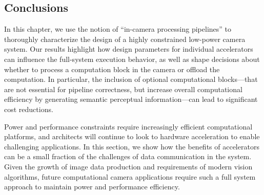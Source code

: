 


\subsection{Conclusions}
 \label{sec:nsp-conclusion}

In this chapter, we use the notion of ``in-camera processing pipelines'' to thoroughly characterize the design of a highly constrained low-power camera system.
Our results highlight how design parameters for individual accelerators can influence the full-system execution behavior, as well as shape decisions about whether to process a computation block in the camera or offload the computation.
In particular, the inclusion of optional computational blocks---that are not essential for pipeline correctness, but increase overall computational efficiency by generating semantic perceptual information---can lead to significant cost reductions.

Power and performance constraints require increasingly efficient computational platforms, and architects will continue to look to hardware acceleration to enable challenging applications.
In this section, we show how the benefits of accelerators can be a small fraction of the challenges of data communication in the system.
Given the growth of image data production and requirements of modern vision algorithms, future computational camera applications require such a full system approach to maintain power and performance efficiency.






